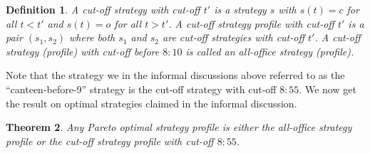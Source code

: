 \documentclass[twocolumn,a4paper,superscriptaddress,nofootinbib]{revtex4}
\newtheorem{theorem}{Theorem}
\newtheorem{definition}[theorem]{Definition}
\begin{document}
\begin{definition}
A \emph{cut-off strategy with cut-off $t'$} is a strategy $s$ with $s(t) = c$ for all $t < t'$ and $s(t) = o$ for all $t > t'$. A \emph{cut-off strategy profile with cut-off $t'$} is a pair $(s_1,s_2)$ where both $s_1$ and $s_2$ are cut-off strategies with cut-off $t'$. A cut-off strategy (profile) with cut-off before $8{:}10$ is called an \emph{all-office strategy (profile)}.
\end{definition}
Note that the strategy we in the informal discussions above referred to as the ``canteen-before-9'' strategy is the cut-off strategy with cut-off $8{:}55$. We now get the result on optimal strategies claimed in the informal discussion.
\begin{theorem}\label{theorem:all-office-or-cut-off}
Any Pareto optimal strategy profile is either the all-office strategy profile or the cut-off strategy profile with cut-off $8{:}55$.
\end{theorem}
\end{document}
